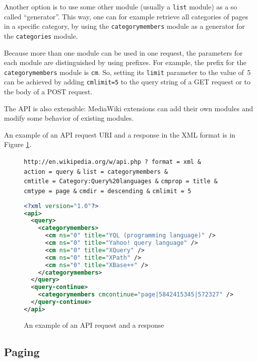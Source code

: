 Another option is to use some other module (usually a \texttt{list} module) as a so called “generator”.
This way, one can for example retrieve all categories of pages in a specific category,
by using the \texttt{categorymembers} module as a generator for the \texttt{categories} module.

Because more than one module can be used in one request,
the parameters for each module are distinguished by using prefixes.
For example, the prefix for the \texttt{categorymembers} module is \texttt{cm}.
So, setting its \texttt{limit} parameter to the value of~5 can be achieved by
adding \texttt{cmlimit=5} to the query string of a GET request or to the body of a POST request.

The API is also extensible: MediaWiki extensions can add their own modules and modify some behavior of existing modules.

An example of an API request URI and a response in the XML format is in Figure \ref{API example}.

\begin{figure}[htbp]
\texttt{http://en.wikipedia.org/w/api.php}~\texttt{?}\
\texttt{format}~\texttt{=}~\texttt{xml}~\texttt{\&}
\texttt{action}~\texttt{=}~\texttt{query}~\texttt{\&}
\texttt{list}~\texttt{=}~\texttt{categorymembers}~\texttt{\&}
\texttt{cmtitle}~\texttt{=}~\texttt{Category:Query\%20languages}~\texttt{\&}
\texttt{cmprop}~\texttt{=}~\texttt{title}~\texttt{\&}
\texttt{cmtype}~\texttt{=}~\texttt{page}~\texttt{\&}
\texttt{cmdir}~\texttt{=}~\texttt{descending}~\texttt{\&}
\texttt{cmlimit}~\texttt{=}~\texttt{5}

\begin{lstlisting}[language=xml]
<?xml version="1.0"?>
<api>
  <query>
    <categorymembers>
      <cm ns="0" title="YQL (programming language)" />
      <cm ns="0" title="Yahoo! query language" />
      <cm ns="0" title="XQuery" />
      <cm ns="0" title="XPath" />
      <cm ns="0" title="XBase++" />
    </categorymembers>
  </query>
  <query-continue>
    <categorymembers cmcontinue="page|5842415345|572327" />
  </query-continue>
</api>
\end{lstlisting}

\caption{An example of an API request and a response}
\label{API example}
\end{figure}

\subsection{Paging}


